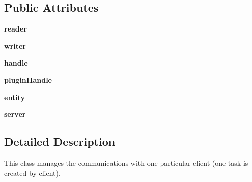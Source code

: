\subsection*{\-Public \-Attributes}
\begin{DoxyCompactItemize}
\item 
\hypertarget{classshared_1_1network_1_1_server_connection_a9abaa1ef8f0f7a5b035149ecb5af4958}{{\bfseries reader}}\label{classshared_1_1network_1_1_server_connection_a9abaa1ef8f0f7a5b035149ecb5af4958}

\item 
\hypertarget{classshared_1_1network_1_1_server_connection_ad054f10d42a972adda553605fa735833}{{\bfseries writer}}\label{classshared_1_1network_1_1_server_connection_ad054f10d42a972adda553605fa735833}

\item 
\hypertarget{classshared_1_1network_1_1_server_connection_aa9ada7c34cafc2e58317babbd7a69016}{{\bfseries handle}}\label{classshared_1_1network_1_1_server_connection_aa9ada7c34cafc2e58317babbd7a69016}

\item 
\hypertarget{classshared_1_1network_1_1_server_connection_aec913912fb7288638504ab3cd7148f7a}{{\bfseries plugin\-Handle}}\label{classshared_1_1network_1_1_server_connection_aec913912fb7288638504ab3cd7148f7a}

\item 
\hypertarget{classshared_1_1network_1_1_server_connection_a51dd0dbdc63994042e3b36c53ff924ab}{{\bfseries entity}}\label{classshared_1_1network_1_1_server_connection_a51dd0dbdc63994042e3b36c53ff924ab}

\item 
\hypertarget{classshared_1_1network_1_1_server_connection_aee1958f23dbc7091346ff17a6df7cd22}{{\bfseries server}}\label{classshared_1_1network_1_1_server_connection_aee1958f23dbc7091346ff17a6df7cd22}

\end{DoxyCompactItemize}


\subsection{\-Detailed \-Description}
\begin{DoxyVerb}
This class manages the communications with one particular client (one
task is created by client).
\end{DoxyVerb}
 

